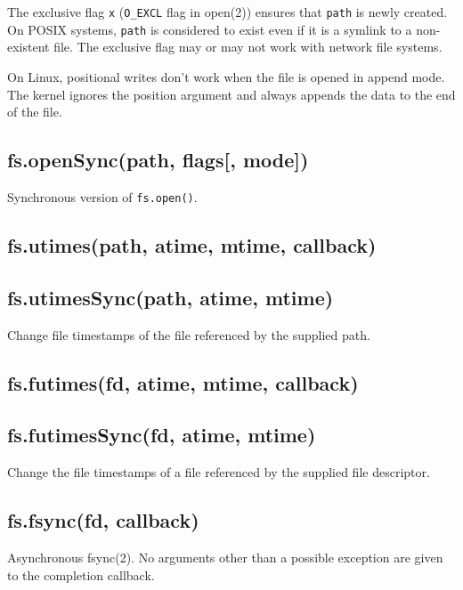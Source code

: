 The exclusive flag \texttt{\textquotesingle{}x\textquotesingle{}}
(\texttt{O\_EXCL} flag in open(2)) ensures that \texttt{path} is newly
created. On POSIX systems, \texttt{path} is considered to exist even if
it is a symlink to a non-existent file. The exclusive flag may or may
not work with network file systems.

On Linux, positional writes don't work when the file is opened in append
mode. The kernel ignores the position argument and always appends the
data to the end of the file.

\subsection{fs.openSync(path, flags{[},
mode{]})}\label{fs.opensyncpath-flags-mode}

Synchronous version of \texttt{fs.open()}.

\subsection{fs.utimes(path, atime, mtime,
callback)}\label{fs.utimespath-atime-mtime-callback}

\subsection{fs.utimesSync(path, atime,
mtime)}\label{fs.utimessyncpath-atime-mtime}

Change file timestamps of the file referenced by the supplied path.

\subsection{fs.futimes(fd, atime, mtime,
callback)}\label{fs.futimesfd-atime-mtime-callback}

\subsection{fs.futimesSync(fd, atime,
mtime)}\label{fs.futimessyncfd-atime-mtime}

Change the file timestamps of a file referenced by the supplied file
descriptor.

\subsection{fs.fsync(fd, callback)}\label{fs.fsyncfd-callback}

Asynchronous fsync(2). No arguments other than a possible exception are
given to the completion callback.

